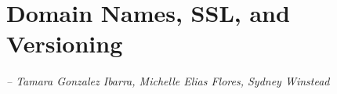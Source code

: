 \chapter{Domain Names, SSL, and Versioning}
\label{Chapter::itDomainNames}

\begin{flushleft}
\small{\textit{-- Tamara Gonzalez Ibarra, Michelle Elias Flores, Sydney Winstead}}
\end{flushleft}


